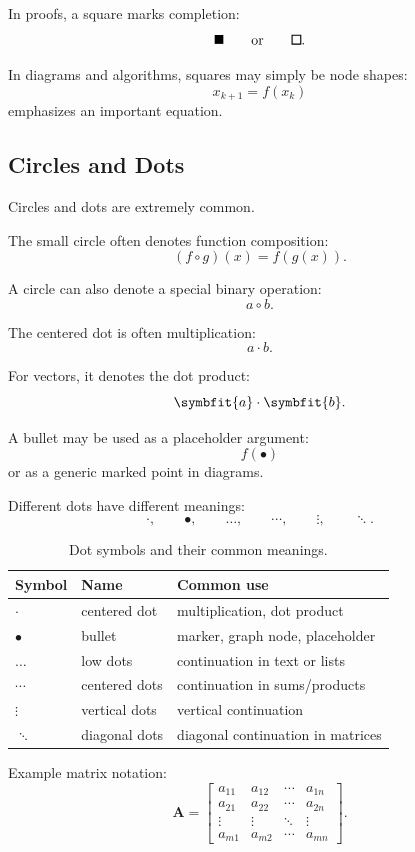 \documentclass[11pt,twocolumn]{article}
\newcommand{\safesquare}{%
  \mathord{\vcenter{\hbox{\tikz[baseline=-0.5ex]\draw[line width=0.08em] (0,0) rectangle (0.62em,0.62em);}}}%
}
\newcommand{\safeblacksquare}{%
  \mathord{\vcenter{\hbox{\tikz[baseline=-0.5ex]\fill (0,0) rectangle (0.62em,0.62em);}}}%
}
\newcommand{\vct}[1]{\symbfit{#1}}   %
\newcommand{\mat}[1]{\symbf{#1}}     %
\begin{document}
In proofs, a square marks completion:
\[
\safeblacksquare
\qquad
\text{or}
\qquad
\safesquare.
\]

In diagrams and algorithms, squares may simply be node shapes:
\[
\boxed{x_{k+1} = f(x_k)}
\]
emphasizes an important equation.

\subsection{Circles and Dots}

Circles and dots are extremely common.

The small circle often denotes function composition:
\[
(f \circ g)(x)
=
f(g(x)).
\]

A circle can also denote a special binary operation:
\[
a \circ b.
\]

The centered dot is often multiplication:
\[
a \cdot b.
\]

For vectors, it denotes the dot product:
\[
\vct{a}\cdot\vct{b}.
\]

A bullet may be used as a placeholder argument:
\[
f(\bullet)
\]
or as a generic marked point in diagrams.

Different dots have different meanings:
\[
\cdot,
\qquad
\bullet,
\qquad
\ldots,
\qquad
\cdots,
\qquad
\vdots,
\qquad
\ddots.
\]

\begin{table}[ht]
\centering
\small
\caption{Dot symbols and their common meanings.}
\begin{tabular}{lll}
\toprule
Symbol & Name & Common use \\
\midrule
$\cdot$ & centered dot & multiplication, dot product \\
$\bullet$ & bullet & marker, graph node, placeholder \\
$\ldots$ & low dots & continuation in text or lists \\
$\cdots$ & centered dots & continuation in sums/products \\
$\vdots$ & vertical dots & vertical continuation \\
$\ddots$ & diagonal dots & diagonal continuation in matrices \\
\bottomrule
\end{tabular}
\end{table}

Example matrix notation:
\[
\mat{A}
=
\begin{bmatrix}
a_{11} & a_{12} & \cdots & a_{1n}\\
a_{21} & a_{22} & \cdots & a_{2n}\\
\vdots & \vdots & \ddots & \vdots\\
a_{m1} & a_{m2} & \cdots & a_{mn}
\end{bmatrix}.
\]
\end{document}
